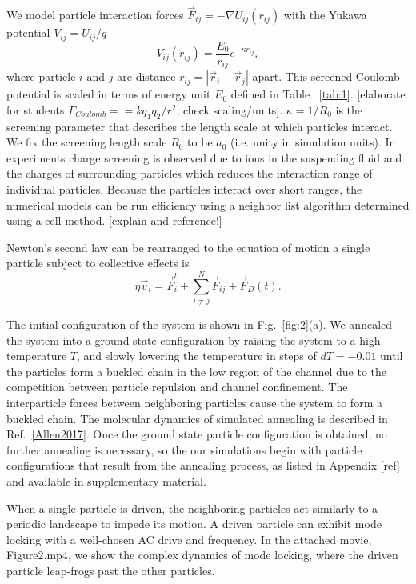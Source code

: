 \documentclass[twocolumn,preprintnumbers,amsmath,amssymb,aps,prx]{revtex4}
\begin{document}
 We model particle interaction forces
$\vec{F}_{ij} = -\nabla U_{ij}(r_{ij})$ 
with
the Yukawa potential $V_{ij} = U_{ij} / q$ 
\begin{equation}
  V_{ij}(r_{ij}) = \frac{E_0}{r_{ij}} e^{-\kappa r_{ij}},
  \label{eq:yukawa}
\end{equation}
where particle $i$ and $j$ are distance
$r_{ij} = |\vec{r}_i - \vec{r}_j|$ apart.
This 
screened Coulomb potential
is scaled in terms of energy unit $E_0$
defined in Table ~\ref{tab:1}.
[elaborate for students $F_{Coulomb} = = k q_1 q_2 / r^2$, check scaling/units].
$\kappa = 1/R_0$ is the screening parameter 
that describes the length scale at
which particles interact.
We fix the screening length scale $R_0$ to be $a_0$
(i.e. unity in simulation units).
In experiments charge screening is observed
due to ions in the suspending fluid and
the charges of surrounding particles
which
reduces the interaction range of individual particles. %
Because the particles interact over short ranges, 
the numerical models can be run efficiency
using a neighbor list algorithm
determined using a cell method.
[explain and reference!]

Newton's second law can be rearranged %
to
the equation of motion a single particle subject to collective effects is 
\begin{equation}
  \eta \vec{v}_i = \vec{F}^l_{i} + \sum_{i \neq j}^{N} \vec{F}_{ij} + \vec{F}_{D}(t).
    \label{eq:motion}
\end{equation}

The initial configuration of the system is shown in 
Fig.~\ref{fig:2}(a).  
We annealed the system into a ground-state configuration
by raising the system to a high temperature $T$,
and slowly lowering the temperature in steps of $dT=-0.01$
until the particles form a buckled chain in the low region of the channel
due to the
competition between particle repulsion and channel confinement.
The interparticle forces between neighboring particles
cause the system to form a buckled chain. %
The molecular dynamics of simulated annealing
is described in Ref.~\ref{Allen2017}.
Once the ground state particle configuration is obtained,
no further annealing is necessary,
so the
our simulations begin with particle configurations
that result from the annealing process,
as listed in Appendix [ref] and available in supplementary material.

When a single particle is driven, the neighboring particles act similarly to a periodic landscape to impede its motion. A driven particle can exhibit mode locking with a well-chosen AC drive and frequency. In the attached movie, Figure2.mp4, we show the complex dynamics of mode locking, where the driven particle leap-frogs past the other particles. 
\end{document}
